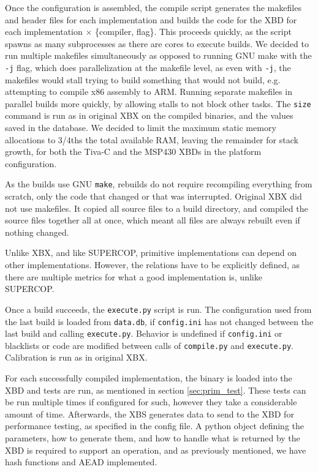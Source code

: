 \documentclass[twoside,11pt]{cergdoc}
\begin{document}
Once the configuration is assembled, the compile script generates the makefiles
and header files for each implementation and builds the code for the XBD for
each implementation $\times$ \{compiler, flag\}. This proceeds quickly, as the
script spawns as many subprocesses as there are cores to execute builds. We
decided to run multiple makefiles simultaneously as opposed to running GNU make
with the \texttt{-j} flag, which does parallelization at the makefile level, as
even with \texttt{-j}, the makefiles would stall trying to build something that
would not build, e.g. attempting to compile x86 assembly to ARM. Running
separate makefiles in parallel builds more quickly, by allowing stalls to not
block other tasks. The \texttt{size} command is run as in original XBX on the
compiled binaries, and the values saved in the database. We decided to limit the
maximum static memory allocations to 3/4ths the total available RAM, leaving the
remainder for stack growth, for both the Tiva-C and the MSP430 XBDs in the
platform configuration.

As the builds use GNU \texttt{make}, rebuilds do not require recompiling everything from
scratch, only the code that changed or that was interrupted. Original XBX did
not use makefiles. It copied all source files to a build directory, and compiled
the source files together all at once, which meant all files are always rebuilt
even if nothing changed. 

Unlike XBX, and like SUPERCOP, primitive implementations can depend on other
implementations. However, the relations have to be explicitly defined, as there
are multiple metrics for what a good implementation is, unlike SUPERCOP.

Once a build succeeds, the \texttt{execute.py} script is run. The configuration
used from the last build is loaded from \texttt{data.db}, if \texttt{config.ini}
has not changed between the last build and calling \texttt{execute.py}. Behavior
is undefined if \texttt{config.ini} or blacklists or code are modified between
calls of \texttt{compile.py} and \texttt{execute.py}. Calibration is run as in
original XBX.


For each successfully compiled implementation, the binary is loaded into the XBD
and tests are run, as mentioned in section \ref{sec:prim_test}. These tests can
be run multiple times if configured for such, however they take a considerable
amount of time. Afterwards, the XBS generates data to send to the XBD for
performance testing, as specified in the config file. A python object defining
the parameters, how to generate them, and how to handle what is returned by the
XBD is required to support an operation, and as previously mentioned, we have
hash functions and AEAD implemented. 
\end{document}
